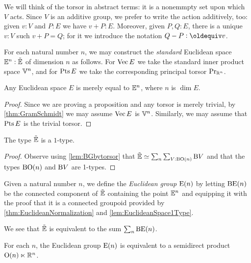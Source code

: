 We will think of the torsor in abstract terms: it is a nonemmpty set upon which
$V$ acts.  Since $V$ is an additive group, we prefer to write the action
additively, too: given $v:V$ and $P:E$ we have $v+P:E$.  Moreover, given
$P,Q:E$, there is a unique $v:V$ such $v+P = Q$; for it we introduce the
notation $Q-P \defeq v$.

For each natural number $n$, we may construct the {\em standard} Euclidean
space $\mathbb E^n : {\tilde {\mathbb E}}$ of dimension $n$ as follows.  For $\operatorname{Vec} E$ we take the
standard inner product space $\mathbb V^n$, and for $\operatorname{Pts} E$ we take the
corresponding principal torsor $\mathrm{Pr}_{{\mathbb{R}^n}}$.

\begin{theorem}\label{thm:EuclideanNormalization}
  Any Euclidean space $E$ is merely equal to $\mathbb E^n$, where $n$ is $\dim E$.
\end{theorem}

\begin{proof}
  Since we are proving a proposition and any torsor is merely trivial, by
  \cref{thm:GramSchmidt} we may assume $\operatorname{Vec} E$ is $\mathbb V^n$.  Similarly, we
  may assume that $\operatorname{Pts} E$ is the trivial torsor.
\end{proof}

\begin{lemma}\label{lem:EuclideanSpace1Type}
  The type ${\tilde {\mathbb E}}$ is a $1$-type.
\end{lemma}

\begin{proof}
  Observe using \cref{lem:BGbytorsor} that
  ${\tilde {\mathbb E}} \simeq \sum_n \sum_{V:\mathrm B \mathrm O(n)} \mathrm B V$ and that the
  types $\mathrm B \mathrm O(n)$ and $\mathrm B V$ are 1-types.
\end{proof}

\begin{definition}\label{def:EuclideanGroup}
  Given a natural number $n$, we define the {\em Euclidean group} $\mathrm E(n)$ by
  letting $\mathrm B \mathrm E(n)$ be the connected component of ${\tilde {\mathbb E}}$ containing the
  point $\mathbb E^n$ and equipping it with the proof that it is a connected
  groupoid provided by \cref{thm:EuclideanNormalization} and
  \cref{lem:EuclideanSpace1Type}.
\end{definition}

We see that ${\tilde {\mathbb E}}$ is equivalent to the sum $\sum_n \mathrm B \mathrm E(n)$.

\begin{theorem}\label{thm:EuclideanGroupSemidirect}
  For each $n$, the Euclidean group $\mathrm E(n)$ is equivalent to a semidirect
  product $\mathrm O(n) \ltimes \mathbb{R}^n$.
\end{theorem}

